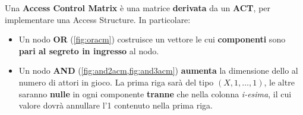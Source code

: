 \begin{definition}\label{def:acm}
Una \textbf{Access Control Matrix} è una matrice \textbf{derivata} da un \textbf{ACT}, per implementare una Access Structure. In particolare:
\begin{itemize}
    \item Un nodo \textbf{OR} (\cref{fig:oracm}) costruisce un vettore le cui \textbf{componenti} sono \textbf{pari al segreto in ingresso} al nodo.
    \item Un nodo \textbf{AND} (\cref{fig:and2acm,fig:and3acm}) \textbf{aumenta} la dimensione dello al numero di attori in gioco. La prima riga sarà del tipo $(X,1,\dots,1)$, le altre saranno \textbf{nulle} in ogni componente \textbf{tranne} che nella colonna \textit{i-esima}, il cui valore dovrà annullare l'1 contenuto nella prima riga.
\end{itemize}
\end{definition}
